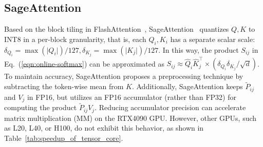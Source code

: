 \subsection{SageAttention} 
Based on the block tiling in FlashAttention~\cite{dao2022flashattention}, SageAttention~\cite{2024sageattention} quantizes $Q, K$ to INT8 in a per-block granularity, that is, each $Q_i, K_i$ has a separate scalar scale:
$\delta_{Q_i} = \max(|{Q_i|})/127, \delta_{K_j} = \max(|{K_j|})/127$. In this way, the product $S_{ij}$ in Eq.~(\ref{eqn:online-softmax}) can be approximated as $S_{ij}\approx \hat Q_i \hat K_j^\top \times (\delta_{Q_i}\delta_{K_j}/\sqrt{d})$.
To maintain accuracy, SageAttention proposes a preprocessing technique by subtracting the token-wise mean from $K$. Additionally, SageAttention keeps $\widetilde P_{ij}$ and $V_j$ in FP16, but utilizes an FP16 accumulator (rather than FP32) for computing the product $\widetilde P_{ij}V_j$. Reducing accumulator precision can accelerate matrix multiplication (MM) on the RTX4090 GPU. However, other GPUs, such as L20, L40, or H100, do not exhibit this behavior, as shown in Table~\ref{tab:speedup_of_tensor_core}.